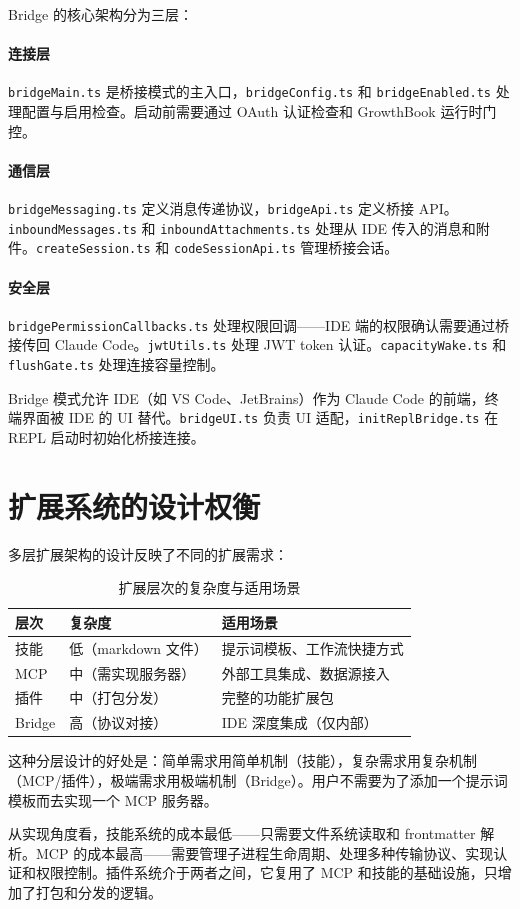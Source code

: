 Bridge 的核心架构分为三层：

\paragraph{连接层}
\texttt{bridgeMain.ts} 是桥接模式的主入口，\texttt{bridgeConfig.ts} 和 \texttt{bridgeEnabled.ts} 处理配置与启用检查。启动前需要通过 OAuth 认证检查和 GrowthBook 运行时门控。

\paragraph{通信层}
\texttt{bridgeMessaging.ts} 定义消息传递协议，\texttt{bridgeApi.ts} 定义桥接 API。\texttt{inboundMessages.ts} 和 \texttt{inboundAttachments.ts} 处理从 IDE 传入的消息和附件。\texttt{createSession.ts} 和 \texttt{codeSessionApi.ts} 管理桥接会话。

\paragraph{安全层}
\texttt{bridgePermissionCallbacks.ts} 处理权限回调——IDE 端的权限确认需要通过桥接传回 Claude Code。\texttt{jwtUtils.ts} 处理 JWT token 认证。\texttt{capacityWake.ts} 和 \texttt{flushGate.ts} 处理连接容量控制。

Bridge 模式允许 IDE（如 VS Code、JetBrains）作为 Claude Code 的前端，终端界面被 IDE 的 UI 替代。\texttt{bridgeUI.ts} 负责 UI 适配，\texttt{initReplBridge.ts} 在 REPL 启动时初始化桥接连接。

\section{扩展系统的设计权衡}

多层扩展架构的设计反映了不同的扩展需求：

\begin{table}[htbp]
\centering
\begin{tabularx}{\textwidth}{llX}
\toprule
\textbf{层次} & \textbf{复杂度} & \textbf{适用场景} \\
\midrule
技能 & 低（markdown 文件） & 提示词模板、工作流快捷方式 \\
MCP & 中（需实现服务器） & 外部工具集成、数据源接入 \\
插件 & 中（打包分发） & 完整的功能扩展包 \\
Bridge & 高（协议对接） & IDE 深度集成（仅内部） \\
\bottomrule
\end{tabularx}
\caption{扩展层次的复杂度与适用场景}
\end{table}

这种分层设计的好处是：简单需求用简单机制（技能），复杂需求用复杂机制（MCP/插件），极端需求用极端机制（Bridge）。用户不需要为了添加一个提示词模板而去实现一个 MCP 服务器。

从实现角度看，技能系统的成本最低——只需要文件系统读取和 frontmatter 解析。MCP 的成本最高——需要管理子进程生命周期、处理多种传输协议、实现认证和权限控制。插件系统介于两者之间，它复用了 MCP 和技能的基础设施，只增加了打包和分发的逻辑。
